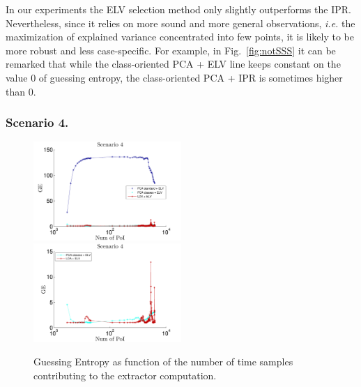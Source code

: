 \begin{remark}
In our experiments the ELV selection method only slightly outperforms the IPR. Nevertheless, since it relies on more sound and more general observations, {\em i.e.} the maximization of explained variance concentrated into few points, it is likely to be more robust and less case-specific. For example, in Fig.~\ref{fig:notSSS} it can be remarked that while the class-oriented PCA + ELV line keeps constant on the value 0 of guessing entropy, the class-oriented PCA + IPR is sometimes higher than 0.
\end{remark}

\subsubsection{Scenario 4.}

\begin{figure}
\includegraphics[width=0.5\textwidth]{../Figures/CARDIS2015/Criterion4.pdf}
\includegraphics[width=0.5\textwidth]{../Figures/CARDIS2015/Criterion4cutted.pdf} 
\caption{Guessing Entropy as function of the number of time samples contributing to the extractor computation.}\label{fig:4}
\end{figure}

